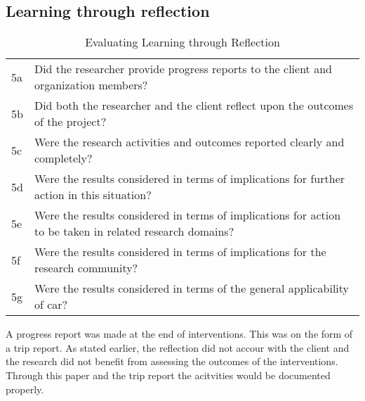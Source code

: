 \subsection{Learning through reflection}
\begin{table}
\centering
\begin{tabular}{p{2cm} p{8cm}}
\hline
5a & Did the researcher provide progress reports to the client and organization members? \\
5b & Did both the researcher and the client reflect upon the outcomes of the project? \\
5c & Were the research activities and outcomes reported clearly and completely? \\
5d & Were the results considered in terms of implications for further action in this situation?  \\
5e & Were the results considered in terms of implications for action to be taken in related research domains? \\
5f & Were the results considered in terms of implications for the research community? \\
5g & Were the results considered in terms of the general applicability of \gls{car}?  \\
\hline
\end{tabular}
\caption{Evaluating Learning through Reflection}
\label{tab:eva}
\end{table}
A progress report was made at the end of interventions. This was on the form of a trip report.
As stated earlier, the reflection did not accour with the client and the research did not benefit from assessing the outcomes of the interventions. Through this paper and the trip report the acitvities would be documented properly.

\cite{car:rmn}
